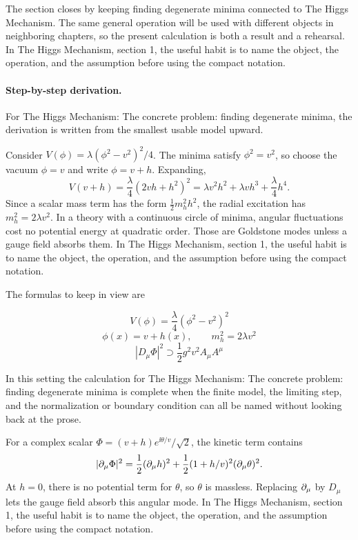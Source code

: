 The section closes by keeping finding degenerate minima connected to The Higgs Mechanism.  The same general operation will be used with different objects in neighboring chapters, so the present calculation is both a result and a rehearsal.  In The Higgs Mechanism, section 1, the useful habit is to name the object, the operation, and the assumption before using the compact notation.



\paragraph{Step-by-step derivation.}

For The Higgs Mechanism: The concrete problem: finding degenerate minima, the derivation is written from the smallest usable model upward.

Consider \(V(\phi)=\lambda(\phi^2-v^2)^2/4\).  The minima satisfy \(\phi^2=v^2\), so choose the vacuum \(\phi=v\) and write \(\phi=v+h\).  Expanding,
\[
  V(v+h)=\frac{\lambda}{4}(2vh+h^2)^2
  =\lambda v^2h^2+\lambda vh^3+\frac{\lambda}{4}h^4.
\]
Since a scalar mass term has the form \(\frac12m_h^2h^2\), the radial excitation has \(m_h^2=2\lambda v^2\).  In a theory with a continuous circle of minima, angular fluctuations cost no potential energy at quadratic order.  Those are Goldstone modes unless a gauge field absorbs them.  In The Higgs Mechanism, section 1, the useful habit is to name the object, the operation, and the assumption before using the compact notation.

The formulas to keep in view are

\[
  V(\phi)=\frac{\lambda}{4}(\phi^2-v^2)^2
\]
\[
  \phi(x)=v+h(x),\qquad m_h^2=2\lambda v^2
\]
\[
  |D_\mu\Phi|^2\supset \frac12g^2v^2A_\mu A^\mu
\]

In this setting the calculation for The Higgs Mechanism: The concrete problem: finding degenerate minima is complete when the finite model, the limiting step, and the normalization or boundary condition can all be named without looking back at the prose.




\begin{example}
For a complex scalar \(\Phi=(v+h)e^{\ii\theta/v}/\sqrt2\), the kinetic term contains
\[
  |\partial_\mu\Phi|^2=\frac12(\partial_\mu h)^2+\frac12(1+h/v)^2(\partial_\mu\theta)^2.
\]
At \(h=0\), there is no potential term for \(\theta\), so \(\theta\) is massless.  Replacing \(\partial_\mu\) by \(D_\mu\) lets the gauge field absorb this angular mode.  In The Higgs Mechanism, section 1, the useful habit is to name the object, the operation, and the assumption before using the compact notation.
\end{example}



